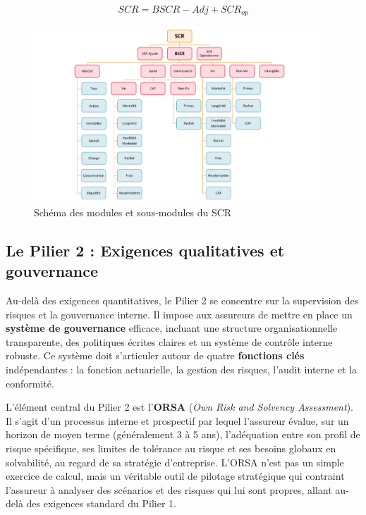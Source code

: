 \bigskip

\begin{equation}
    SCR = BSCR - Adj + SCR_{op}
\end{equation}

\bigskip

\begin{figure}[H]
    \centering
    \includegraphics[width=0.95\textwidth]{images/pieuvre_scr.png}
    \caption{Schéma des modules et sous-modules du SCR}
    \label{fig:pieuvre_scr}
\end{figure}

\subsection{Le Pilier 2 : Exigences qualitatives et gouvernance}

Au-delà des exigences quantitatives, le Pilier 2 se concentre sur la supervision des risques et la gouvernance interne. Il impose aux assureurs de mettre en place un \textbf{système de gouvernance} efficace, incluant une structure organisationnelle transparente, des politiques écrites claires et un système de contrôle interne robuste. Ce système doit s'articuler autour de quatre \textbf{fonctions clés} indépendantes : la fonction actuarielle, la gestion des risques, l'audit interne et la conformité.

\bigskip

L'élément central du Pilier 2 est l'\textbf{ORSA} (\textit{Own Risk and Solvency Assessment}). Il s'agit d'un processus interne et prospectif par lequel l'assureur évalue, sur un horizon de moyen terme (généralement 3 à 5 ans), l'adéquation entre son profil de risque spécifique, ses limites de tolérance au risque et ses besoins globaux en solvabilité, au regard de sa stratégie d'entreprise. L'ORSA n'est pas un simple exercice de calcul, mais un véritable outil de pilotage stratégique qui contraint l'assureur à analyser des scénarios et des risques qui lui sont propres, allant au-delà des exigences standard du Pilier 1.

